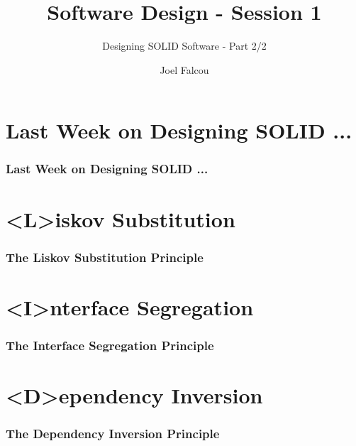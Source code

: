 \documentclass{beamer}
\title{Software Design - Session 1}
\subtitle{Designing SOLID Software - Part 2/2}
\author{Joel Falcou}
\institute{Laboratoire de Recherche en Informatique - Université Paris Sud 11}
\date{}
\begin{document}
\begin{frame}[plain]
\titlepage
\end{frame}

\section{Last Week on Designing SOLID ...}
\frame
{
  \frametitle{Last Week on Designing SOLID ...}
}

\section{<L>iskov Substitution}
\frame
{
  \frametitle{The Liskov Substitution Principle}
  \begin{center}\end{center}
}

\frame
{

}

\section{<I>nterface Segregation}
\frame
{
  \frametitle{The Interface Segregation Principle}
  \begin{center}\end{center}
}

\frame{}

\section{<D>ependency Inversion}
\frame
{
  \frametitle{The Dependency Inversion Principle}
  \begin{center}\end{center}
}

\frame{}
\end{document}
